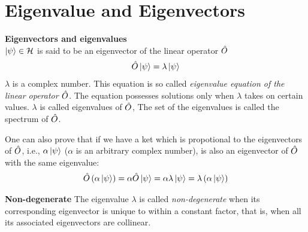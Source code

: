 \section{Eigenvalue and Eigenvectors}
\begin{definition}{\textbf{Eigenvectors and eigenvalues}}
    \\
    $\ket{\psi} \in \mathcal{H}$ is said to be an eigenvector of the linear operator $\hat{O}$
    \begin{eqnarray}
        \hat{O} \ket{\psi} = \lambda \ket{\psi} \label{eq:eigen}
    \end{eqnarray}
    $\lambda$ is a complex number. This equation is so called \emph{eigenvalue equation of the linear operator $\hat{O}$}. The equation possesses solutions only when $\lambda$ takes on certain values. $\lambda$ is called eigenvalues of $\hat{O}$, The set of the eigenvalues is called the spectrum of $\hat{O}$.
\end{definition}
One can also prove that if we have a ket which is propotional to the eigenvectors of $\hat{O}$, i.e., $\alpha \ket{\psi}$ ($\alpha$ is an arbitrary complex number), is also an eigenvector of $\hat{O}$ with the same eigenvalue:
\begin{eqnarray}
    \hat{O} \left( \alpha \ket{\psi} \right) = \alpha \hat{O} \ket{\psi} = \alpha \lambda \ket{\psi} = \lambda \left( \alpha \ket{\psi} \right)
\end{eqnarray}

\begin{definition}{\textbf{Non-degenerate}}
    The eigenvalue $\lambda$ is called \emph{non-degenerate} when its corresponding eigenvector is unique to within a constant factor, that is, when all its associated eigenvectors are collinear.
\end{definition}

